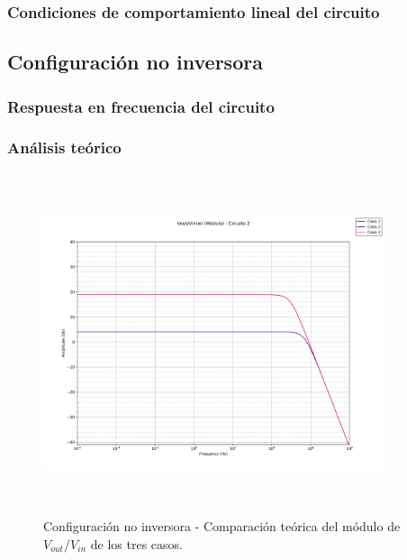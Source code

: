 \subsubsection{Condiciones de comportamiento lineal del circuito}


\subsection{Configuraci\'on no inversora}

\subsubsection{Respuesta en frecuencia del circuito} %
\subsubsection*{An\'alisis te\'orico} %

\begin{figure}[H] %
\centering
\includegraphics[width=10cm,height=10cm,keepaspectratio]{../EJ1/00GRAFICOS/teoricos/circ2voviw.png}
\caption{Configuración no inversora - Comparaci\'on te\'orica del m\'odulo de$V_{out}/V_{in}$ de los tres casos.}
\label{c2voviTeoMod}
\end{figure}

